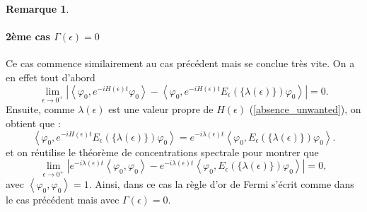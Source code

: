 \documentclass[12pt,openany,a4paper, titlepage]{article}
\newcommand{\la}{\left\langle}
\newcommand{\ra}{\right\rangle}
\newcommand{\vp}{\varphi}
\theoremstyle{definition}
\theoremstyle{definition}
\theoremstyle{definition}
\theoremstyle{definition}
\theoremstyle{definition}
\newtheorem{rem}{Remarque}
\theoremstyle{definition}
\begin{document}
\begin{rem}
\paragraph{2ème cas $\Gamma(\epsilon) = 0$}
Ce cas commence similairement au cas précédent mais se conclue très vite. On a en effet tout d'abord 
\begin{equation}
    \lim\limits_{\epsilon \rightarrow 0^+} \left|\la \vp_0, e^{-iH(\epsilon)t} \vp_0 \ra - \la \vp_0, e^{-iH(\epsilon)t} E_\epsilon(\{\lambda(\epsilon)\})\vp_0 \ra \right| = 0.
\end{equation}
Ensuite, comme $\lambda(\epsilon)$ est une valeur propre de $H(\epsilon)$ (\ref{absence_unwanted}), on obtient que :
\begin{equation}
    \la \vp_0, e^{-iH(\epsilon)t} E_\epsilon(\{\lambda(\epsilon)\})\vp_0 \ra  = e^{-i\lambda(\epsilon)t}\la \vp_0,  E_\epsilon(\{\lambda(\epsilon)\})\vp_0 \ra.
\end{equation}
et on réutilise le théorème de concentrations spectrale pour montrer que 
\begin{equation}
    \lim\limits_{\epsilon \rightarrow 0^+} \left|e^{-i\lambda(\epsilon)t} \la \vp_0, \vp_0 \ra - e^{-i\lambda(\epsilon)t}\la \vp_0, E_\epsilon(\{\lambda(\epsilon)\})\vp_0 \ra \right| = 0,
\end{equation}
avec $\la \vp_0, \vp_0 \ra = 1$.
Ainsi, dans ce cas la règle d'or de Fermi s'écrit comme dans le cas précédent mais avec $\Gamma(\epsilon) = 0$.




\end{rem}
\end{document}
